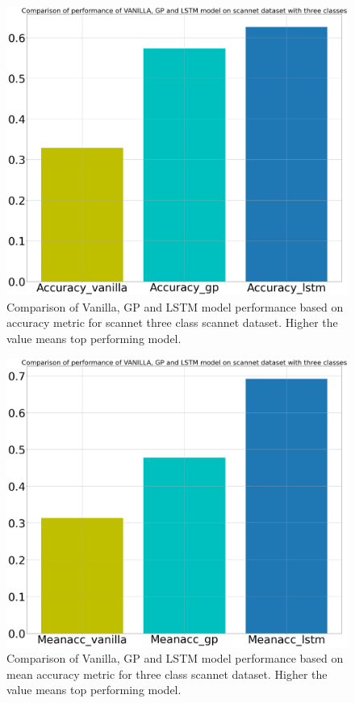 	\begin{figure}
		\centering
		\includegraphics[width=12cm]{images/three_classes_acc.png}
		\caption{Comparison of Vanilla, GP and LSTM model performance based on accuracy metric for scannet three class scannet dataset. Higher the value means top performing model.}
		\label{fig:performance_metric_three_classes_unet}
	\end{figure}

	\begin{figure}
		\centering
		\includegraphics[width=12cm]{images/three_classes_meanacc.png}
		\caption{Comparison of Vanilla, GP and LSTM model performance based on mean accuracy metric for three class scannet dataset. Higher the value means top performing model.}
		\label{fig:performance_metric_three_classes_unet}
	\end{figure}

